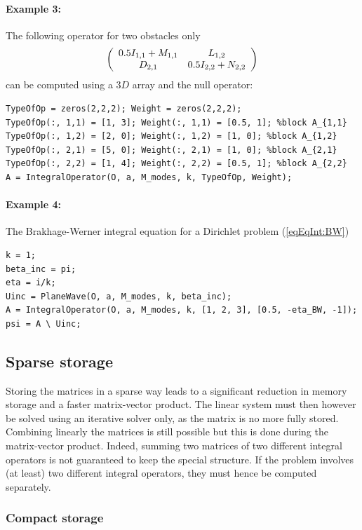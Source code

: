 \paragraph{Example 3:} The following operator for two obstacles only
$$
\left(\begin{array}{c c}
0.5 I_{1,1}+ M_{1,1} & L_{1,2}\\
D_{2,1} & 0.5 I_{2,2}+N_{2,2}
\end{array}\right)
$$
can be computed using a $3D$ array and the null operator:
\begin{lstlisting}
TypeOfOp = zeros(2,2,2); Weight = zeros(2,2,2);
TypeOfOp(:, 1,1) = [1, 3]; Weight(:, 1,1) = [0.5, 1]; %block A_{1,1}
TypeOfOp(:, 1,2) = [2, 0]; Weight(:, 1,2) = [1, 0]; %block A_{1,2}
TypeOfOp(:, 2,1) = [5, 0]; Weight(:, 2,1) = [1, 0]; %block A_{2,1}
TypeOfOp(:, 2,2) = [1, 4]; Weight(:, 2,2) = [0.5, 1]; %block A_{2,2}
A = IntegralOperator(O, a, M_modes, k, TypeOfOp, Weight);
\end{lstlisting}
\paragraph{Example 4:} The Brakhage-Werner integral equation for a Dirichlet problem (\ref{eqEqInt:BW})
\begin{lstlisting}
k = 1;
beta_inc = pi;
eta = i/k;
Uinc = PlaneWave(O, a, M_modes, k, beta_inc);
A = IntegralOperator(O, a, M_modes, k, [1, 2, 3], [0.5, -eta_BW, -1]);
psi = A \ Uinc;
\end{lstlisting}

\subsection{Sparse storage}

Storing the matrices in a sparse way leads to a significant reduction in memory storage and a faster matrix-vector product. The linear system must then however be solved using an iterative solver only, as the matrix is no more fully stored. Combining linearly the matrices is still possible but this is done during the matrix-vector product. Indeed, summing two matrices of two different integral operators is not guaranteed to keep the special structure. If the problem involves (at least) two different integral operators, they must hence be computed separately.

\subsubsection{Compact storage}

